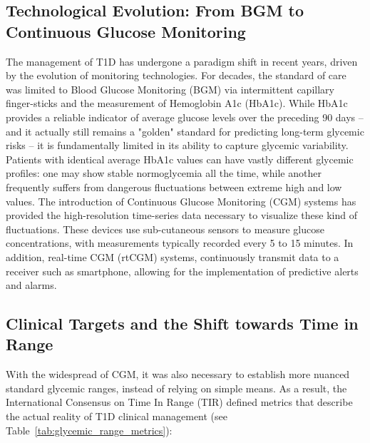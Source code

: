 \subsection{Technological Evolution: From BGM to Continuous Glucose Monitoring}
\label{subsec:technological_evolution}

The management of T1D has undergone a paradigm shift in recent years, driven by the evolution of monitoring technologies. For decades, the standard of care was limited to Blood Glucose Monitoring (BGM) via intermittent capillary finger-sticks and the measurement of Hemoglobin A1c (HbA1c). While HbA1c provides a reliable indicator of average glucose levels over the preceding 90 days -- and it actually still remains a "golden" standard for predicting long-term glycemic risks – it is fundamentally limited in its ability to capture glycemic variability. Patients with identical average HbA1c values can have vastly different glycemic profiles: one may show stable normoglycemia all the time, while another frequently suffers from dangerous fluctuations between extreme high and low values.
The introduction of Continuous Glucose Monitoring (CGM) systems has provided the high-resolution time-series data necessary to visualize these kind of fluctuations. These devices use sub-cutaneous sensors to measure glucose concentrations, with measurements typically recorded every 5 to 15 minutes. In addition, real-time CGM (rtCGM) systems, continuously transmit data to a receiver such as smartphone, allowing for the implementation of predictive alerts and alarms.

\subsection{Clinical Targets and the Shift towards Time in Range}
\label{TIR-explanation}
With the widespread of CGM, it was also necessary to establish more nuanced standard glycemic ranges, instead of relying on simple means. As a result, the International Consensus on Time In Range (TIR) \cite{10.2337/dci19-0028} defined metrics that describe the actual reality of T1D clinical management (see Table~\ref{tab:glycemic_range_metrics}):

